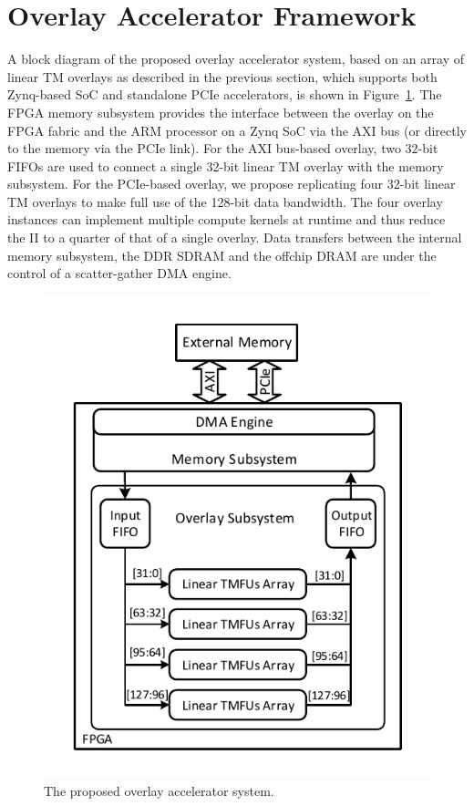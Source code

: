 \section{Overlay Accelerator Framework}
A block diagram of the proposed overlay accelerator system, based on an array of linear TM overlays as described in the previous section, which supports both Zynq-based SoC and standalone PCIe accelerators, is shown in Figure~\ref{system}. 
The FPGA memory subsystem provides the interface between the overlay on the FPGA fabric and the ARM processor on a Zynq SoC via the AXI bus (or directly to the memory via the PCIe link). 
For the AXI bus-based overlay, two 32-bit FIFOs are used to connect a single 32-bit linear TM overlay with the memory subsystem. 
For the PCIe-based overlay, we propose replicating four 32-bit linear TM overlays to make full use of the 128-bit data bandwidth. The four overlay instances can implement multiple compute kernels at runtime and thus reduce the II to a quarter of that of a single overlay. 
Data transfers between the internal memory subsystem, the DDR SDRAM and the offchip DRAM are under the control of a scatter-gather DMA engine. 

\begin{figure}[tb]
	\centering
	\includegraphics[width=\columnwidth]{Figures/system_new.pdf}
	\caption{The proposed overlay accelerator system.}
	\label{system}
\end{figure}

